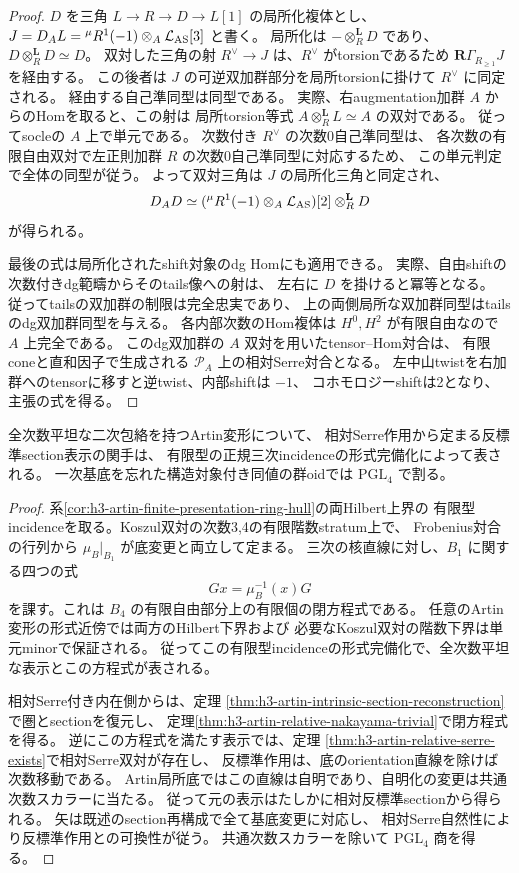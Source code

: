 \begin{proof}
$D$ を三角 $L\to R\to D\to L[1]$ の局所化複体とし、
$J=D_A L={}^{\mu}R^1(-1)\otimes_A\mathcal L_{\rm AS}[3]$ と書く。
局所化は $-\otimes_R^{\mathbf L}D$ であり、$D\otimes_R^{\mathbf L}D\simeq D$。
双対した三角の射 $R^\vee\to J$ は、$R^\vee$ がtorsionであるため
$\mathbf R\Gamma_{R_{\ge1}}J$ を経由する。
この後者は $J$ の可逆双加群部分を局所torsionに掛けて $R^\vee$ に同定される。
経由する自己準同型は同型である。
実際、右augmentation加群 $A$ からのHomを取ると、この射は
局所torsion等式 $A\otimes_R^{\mathbf L}L\simeq A$ の双対である。
従ってsocleの $A$ 上で単元である。
次数付き $R^\vee$ の次数0自己準同型は、
各次数の有限自由双対で左正則加群 $R$ の次数0自己準同型に対応するため、
この単元判定で全体の同型が従う。
よって双対三角は $J$ の局所化三角と同定され、
\[
 D_A D\simeq ({}^\mu R^1(-1)\otimes_A\mathcal L_{\rm AS})[2]
                     \otimes_R^{\mathbf L}D
\]
が得られる。

最後の式は局所化されたshift対象のdg Homにも適用できる。
実際、自由shiftの次数付きdg範疇からそのtails像への射は、
左右に $D$ を掛けると冪等となる。
従ってtailsの双加群の制限は完全忠実であり、
上の両側局所な双加群同型はtailsのdg双加群同型を与える。
各内部次数のHom複体は $H^0,H^2$ が有限自由なので $A$ 上完全である。
このdg双加群の $A$ 双対を用いたtensor--Hom対合は、
有限coneと直和因子で生成される $\mathcal P_A$ 上の相対Serre対合となる。
左中山twistを右加群へのtensorに移すと逆twist、内部shiftは $-1$、
コホモロジーshiftは2となり、主張の式を得る。
\end{proof}

\begin{corollary}\label{cor:h3-artin-intrinsic-formal-atlas}
全次数平坦な二次包絡を持つArtin変形について、
相対Serre作用から定まる反標準section表示の関手は、
有限型の正規三次incidenceの形式完備化によって表される。
一次基底を忘れた構造対象付き同値の群oidでは $\mathrm{PGL}_4$ で割る。
\end{corollary}
\begin{proof}
系\ref{cor:h3-artin-finite-presentation-ring-hull}の両Hilbert上界の
有限型incidenceを取る。Koszul双対の次数3,4の有限階数stratum上で、
Frobenius対合の行列から $\mu_B|_{B_1}$ が底変更と両立して定まる。
三次の核直線に対し、$B_1$ に関する四つの式
\[
 Gx=\mu_B^{-1}(x)G
\]
を課す。これは $B_4$ の有限自由部分上の有限個の閉方程式である。
任意のArtin変形の形式近傍では両方のHilbert下界および
必要なKoszul双対の階数下界は単元minorで保証される。
従ってこの有限型incidenceの形式完備化で、全次数平坦な表示とこの方程式が表される。

相対Serre付き内在側からは、定理
\ref{thm:h3-artin-intrinsic-section-reconstruction}で圏とsectionを復元し、
定理\ref{thm:h3-artin-relative-nakayama-trivial}で閉方程式を得る。
逆にこの方程式を満たす表示では、定理
\ref{thm:h3-artin-relative-serre-exists}で相対Serre双対が存在し、
反標準作用は、底のorientation直線を除けば次数移動である。
Artin局所底ではこの直線は自明であり、自明化の変更は共通次数スカラーに当たる。
従って元の表示はたしかに相対反標準sectionから得られる。
矢は既述のsection再構成で全て基底変更に対応し、
相対Serre自然性により反標準作用との可換性が従う。
共通次数スカラーを除いて $\mathrm{PGL}_4$ 商を得る。
\end{proof}

